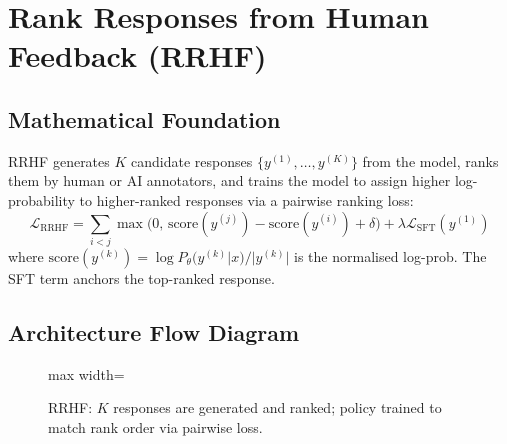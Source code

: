 \section{Rank Responses from Human Feedback (RRHF)}

\subsection{Mathematical Foundation}
RRHF generates $K$ candidate responses $\{y^{(1)}, \ldots, y^{(K)}\}$ from the model, ranks them by human or AI annotators, and trains the model to assign higher log-probability to higher-ranked responses via a pairwise ranking loss:
\begin{equation}
  \mathcal{L}_{\text{RRHF}} = \sum_{i < j}\max\!\bigl(0,\, \text{score}(y^{(j)}) - \text{score}(y^{(i)}) + \delta\bigr) + \lambda \mathcal{L}_{\text{SFT}}(y^{(1)})
\end{equation}
where $\text{score}(y^{(k)}) = \log P_\theta(y^{(k)}|x)/|y^{(k)}|$ is the normalised log-prob. The SFT term anchors the top-ranked response.

\subsection{Architecture Flow Diagram}

\begin{figure}[h]
\centering
\begin{adjustbox}{max width=\linewidth}
\end{adjustbox}
\caption{RRHF: $K$ responses are generated and ranked; policy trained to match rank order via pairwise loss.}
\end{figure}

